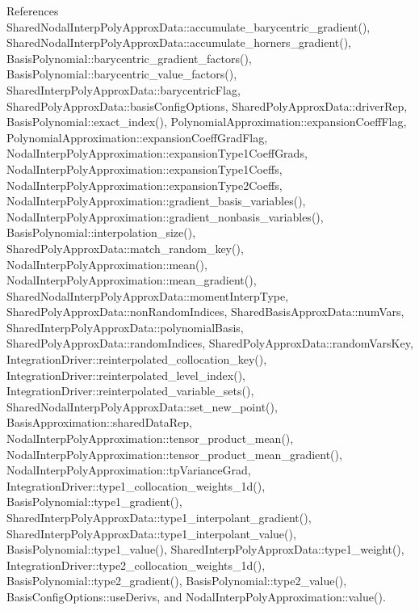References Shared\+Nodal\+Interp\+Poly\+Approx\+Data\+::accumulate\+\_\+barycentric\+\_\+gradient(), Shared\+Nodal\+Interp\+Poly\+Approx\+Data\+::accumulate\+\_\+horners\+\_\+gradient(), Basis\+Polynomial\+::barycentric\+\_\+gradient\+\_\+factors(), Basis\+Polynomial\+::barycentric\+\_\+value\+\_\+factors(), Shared\+Interp\+Poly\+Approx\+Data\+::barycentric\+Flag, Shared\+Poly\+Approx\+Data\+::basis\+Config\+Options, Shared\+Poly\+Approx\+Data\+::driver\+Rep, Basis\+Polynomial\+::exact\+\_\+index(), Polynomial\+Approximation\+::expansion\+Coeff\+Flag, Polynomial\+Approximation\+::expansion\+Coeff\+Grad\+Flag, Nodal\+Interp\+Poly\+Approximation\+::expansion\+Type1\+Coeff\+Grads, Nodal\+Interp\+Poly\+Approximation\+::expansion\+Type1\+Coeffs, Nodal\+Interp\+Poly\+Approximation\+::expansion\+Type2\+Coeffs, Nodal\+Interp\+Poly\+Approximation\+::gradient\+\_\+basis\+\_\+variables(), Nodal\+Interp\+Poly\+Approximation\+::gradient\+\_\+nonbasis\+\_\+variables(), Basis\+Polynomial\+::interpolation\+\_\+size(), Shared\+Poly\+Approx\+Data\+::match\+\_\+random\+\_\+key(), Nodal\+Interp\+Poly\+Approximation\+::mean(), Nodal\+Interp\+Poly\+Approximation\+::mean\+\_\+gradient(), Shared\+Nodal\+Interp\+Poly\+Approx\+Data\+::moment\+Interp\+Type, Shared\+Poly\+Approx\+Data\+::non\+Random\+Indices, Shared\+Basis\+Approx\+Data\+::num\+Vars, Shared\+Interp\+Poly\+Approx\+Data\+::polynomial\+Basis, Shared\+Poly\+Approx\+Data\+::random\+Indices, Shared\+Poly\+Approx\+Data\+::random\+Vars\+Key, Integration\+Driver\+::reinterpolated\+\_\+collocation\+\_\+key(), Integration\+Driver\+::reinterpolated\+\_\+level\+\_\+index(), Integration\+Driver\+::reinterpolated\+\_\+variable\+\_\+sets(), Shared\+Nodal\+Interp\+Poly\+Approx\+Data\+::set\+\_\+new\+\_\+point(), Basis\+Approximation\+::shared\+Data\+Rep, Nodal\+Interp\+Poly\+Approximation\+::tensor\+\_\+product\+\_\+mean(), Nodal\+Interp\+Poly\+Approximation\+::tensor\+\_\+product\+\_\+mean\+\_\+gradient(), Nodal\+Interp\+Poly\+Approximation\+::tp\+Variance\+Grad, Integration\+Driver\+::type1\+\_\+collocation\+\_\+weights\+\_\+1d(), Basis\+Polynomial\+::type1\+\_\+gradient(), Shared\+Interp\+Poly\+Approx\+Data\+::type1\+\_\+interpolant\+\_\+gradient(), Shared\+Interp\+Poly\+Approx\+Data\+::type1\+\_\+interpolant\+\_\+value(), Basis\+Polynomial\+::type1\+\_\+value(), Shared\+Interp\+Poly\+Approx\+Data\+::type1\+\_\+weight(), Integration\+Driver\+::type2\+\_\+collocation\+\_\+weights\+\_\+1d(), Basis\+Polynomial\+::type2\+\_\+gradient(), Basis\+Polynomial\+::type2\+\_\+value(), Basis\+Config\+Options\+::use\+Derivs, and Nodal\+Interp\+Poly\+Approximation\+::value().



